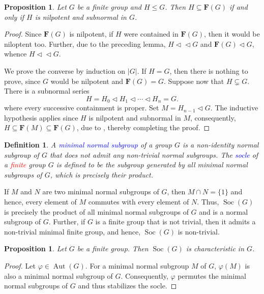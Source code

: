 \documentclass[12pt]{article}
\theoremstyle{thmstyle}
\newtheorem{proposition}[theorem]{Proposition}
\theoremstyle{defstyle}
\newtheorem{definition}[theorem]{Definition}
\newcommand{\Aut}{\operatorname{Aut}}
\newcommand{\define}[1]{\textcolor{blue}{\textit{#1}}}
\newcommand{\caution}[1]{\textcolor{red}{\textit{#1}}}
\renewcommand{\le}{\leqslant}
\newcommand{\bfF}{\mathbf{F}} %
\newcommand{\nor}{\vartriangleleft}
\newcommand{\subnor}{\nor\!\nor}
\newcommand{\Soc}{\operatorname{Soc}}
\begin{document}
\begin{proposition}
    Let $G$ be a finite group and $H\le G$. Then $H\subseteq\bfF(G)$ if and only if $H$ is nilpotent and subnormal in $G$.
\end{proposition}
\begin{proof}
    Since $\bfF(G)$ is nilpotent, if $H$ were contained in $\bfF(G)$, then it would be niloptent too. Further, due to the preceding lemma, $H\subnor G$ and $\bfF(G)\nor G$, whence $H\subnor G$.

    We prove the converse by induction on $|G|$. If $H = G$, then there is nothing to prove, since $G$ would be nilpotent and $\bfF(G) = G$. Suppose now that $H\subsetneq G$. There is a subnormal series
    \begin{equation*}
        H = H_0\nor H_1\nor\cdots\nor H_n = G.
    \end{equation*}
    where every successive containment is proper. Set $M = H_{n - 1}\nor G$. The inductive hypothesis applies since $H$ is nilpotent and subnormal in $M$, consequently, $H\subseteq\bfF(M)\subseteq\bfF(G)$, due to , thereby completing the proof.
\end{proof}

\begin{definition}
    A \define{minimal normal subgroup} of a group $G$ is a non-identity normal subgroup of $G$ that does not admit any non-trivial normal subgroups. The \define{socle} of a \caution{finite} group $G$ is defined to be the subgroup generated by all minimal normal subgroups of $G$, which is precisely their product.
\end{definition}

If $M$ and $N$ are two minimal normal subgroups of $G$, then $M\cap N = \{1\}$ and hence, every element of $M$ commutes with every element of $N$. Thus, $\Soc(G)$ is precisely the product of all minimal normal subgroups of $G$ and is a normal subgroup of $G$. Further, if $G$ is a finite group that is not trivial, then it admits a non-trivial minimal finite group, and hence, $\Soc(G)$ is non-trivial.

\begin{proposition}
    Let $G$ be a finite group. Then $\Soc(G)$ is characteristic in $G$.
\end{proposition}
\begin{proof}
    Let $\varphi\in\Aut(G)$. For a minimal normal subgroup $M$ of $G$, $\varphi(M)$ is also a minimal normal subgroup of $G$. Consequently, $\varphi$ permutes the minimal normal subgroups of $G$ and thus stabilizes the socle.
\end{proof}
\end{document}
